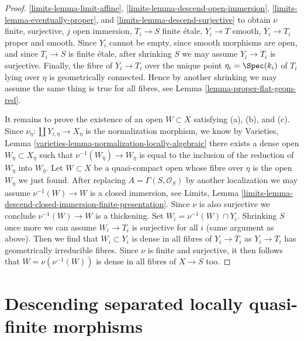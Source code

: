 \begin{proof}
\ref{limits-lemma-limit-affine},
\ref{limits-lemma-descend-open-immersion},
\ref{limits-lemma-eventually-proper}, and
\ref{limits-lemma-descend-surjective}
to obtain $\nu$ finite, surjective, $j$ open immersion, $T_i \to S$ finite
\'etale, $Y_i \to T$ smooth, $\overline{Y}_i \to T_i$ proper and
smooth. Since $Y_i$ cannot be empty, since smooth morphisms
are open, and since $T_i \to S$ is finite \'etale, after shrinking $S$
we may assume $Y_i \to T_i$ is surjective. Finally, the fibre of
$\overline{Y}_i \to T_i$ over the unique point $\eta_i = \Spec(k_i)$ 
of $T_i$ lying over $\eta$ is geometrically connected.
Hence by another shrinking we may assume the same thing is
true for all fibres, see
Lemma \ref{lemma-proper-flat-geom-red}.

\medskip\noindent
It remains to prove the existence of an open $W \subset X$
satisfying (a), (b), and (c). Since $\nu_\eta : \coprod Y_{i, \eta} \to X_\eta$
is the normalization morphism, we know by
Varieties, Lemma \ref{varieties-lemma-normalization-locally-algebraic}
there exists a dense open $W_\eta \subset X_\eta$
such that $\nu^{-1}(W_\eta) \to W_\eta$ is equal to
the inclusion of the reduction of $W_\eta$ into $W_\eta$.
Let $W \subset X$ be a quasi-compact open whose fibre
over $\eta$ is the open $W_\eta$ we just found.
After replacing $A = \Gamma(S, \mathcal{O}_S)$
by another localization we may assume $\nu^{-1}(W) \to W$
is a closed immersion, see Limits, Lemma
\ref{limits-lemma-descend-closed-immersion-finite-presentation}.
Since $\nu$ is also surjective we conclude
$\nu^{-1}(W) \to W$ is a thickening.
Set $W_i = \nu^{-1}(W) \cap Y_i$.
Shrinking $S$ once more we can assume $W_i \to T_i$ is
surjective for all $i$ (same argument as above).
Then we find that $W_i \subset Y_i$
is dense in all fibres of $Y_i \to T_i$ as $Y_i \to T_i$ has
geometrically irreducible fibres.
Since $\nu$ is finite and surjective, it then follows
that $W = \nu(\nu^{-1}(W))$ is dense in all fibres
of $X \to S$ too.
\end{proof}











\section{Descending separated locally quasi-finite morphisms}
\label{section-separated-locally-quasi-finite}

